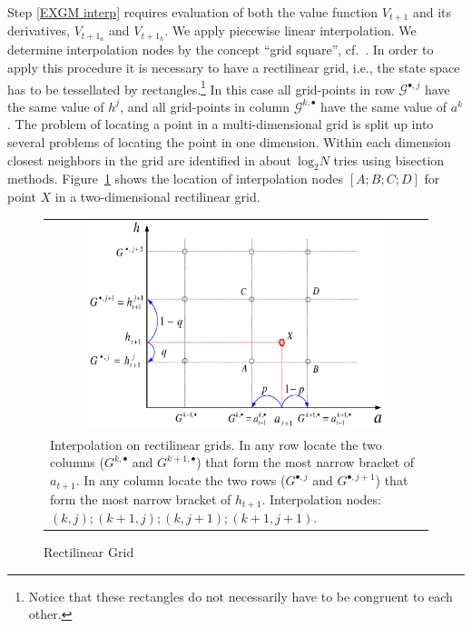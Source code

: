 \documentclass[a4paper,12pt]{article}%
\begin{document}
Step \ref{EXGM interp} requires evaluation of both the value function $V_{t+1}$ and its derivatives, $V_{t+1_{a}}$ and $V_{t+1_{h}}$. We apply piecewise linear interpolation. We determine interpolation nodes by the concept \textquotedblleft grid square\textquotedblright, cf.~. In order to apply this procedure it is necessary to have a rectilinear grid, i.e., the state space has to be tessellated by rectangles.\footnote{Notice that these rectangles do not necessarily have to be congruent to each other.}
In this case all grid-points in row $\mathcal{G}^{\bullet,j}$ have the same value of $h^{j}$, and all grid-points in column $\mathcal{G}^{k,\bullet}$ have the same value of $a^{k}$. The problem of locating a point in a multi-dimensional grid is split up into several problems of locating the point in one dimension. Within each dimension closest neighbors in the grid are identified in about~$\text{log}_{2}N$ tries using bisection methods. Figure~\ref{Rectilinear_Grid} shows the location of interpolation nodes $[A;B;C;D]$ for point $X$ in a two-dimensional rectilinear grid.
\begin{figure}[htb] \centering
\caption{Rectilinear Grid}
\begin{tabular}
[c]{p{15cm}}
\\
\multicolumn{1}{c}{{\includegraphics[height=6.0cm, width=9.0cm]{Abbildungen/exo.eps}}}\\
{\footnotesize {Interpolation on rectilinear grids. In any row locate the two columns ($G^{k,\bullet}$ and $G^{k+1,\bullet}$) that form the most narrow bracket of $a_{t+1}$. In any column locate the two rows ($G^{\bullet,j}$ and $G^{\bullet,j+1}$) that form the most narrow bracket of $h_{t+1}$. Interpolation nodes: $(k,j);(k+1,j);(k,j+1);(k+1,j+1)$.}}%
\end{tabular}
\label{Rectilinear_Grid}
\end{figure}
\end{document}
